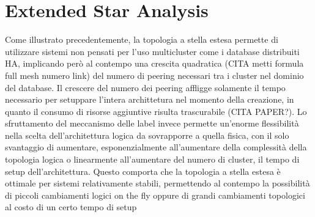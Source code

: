 \section{Extended Star Analysis}
Come illustrato precedentemente, la topologia a stella estesa permette di utilizzare sistemi non pensati per l'uso multicluster come i database distribuiti HA, implicando però al contempo una crescita quadratica (CITA metti formula full mesh numero link) del numero di peering necessari tra i cluster nel dominio del database. Il crescere del numero dei peering affligge solamente il tempo necessario per setuppare l'intera archittetura nel momento della creazione, in quanto il consumo di risorse aggiuntive risulta trascurabile (CITA PAPER?). 
Lo sfruttamento del meccanismo delle label invece permette un'enorme flessibilità nella scelta dell'architettura logica da sovrapporre a quella fisica, con il solo svantaggio di aumentare, esponenzialmente all'aumentare della complessità della topologia logica o linearmente all'aumentare del numero di cluster, il tempo di setup dell'architettura.
Questo comporta che la topologia a stella estesa è ottimale per sistemi relativamente stabili, permettendo al contempo la possibilità di piccoli cambiamenti logici on the fly oppure di grandi cambiamenti topologici al costo di un certo tempo di setup
